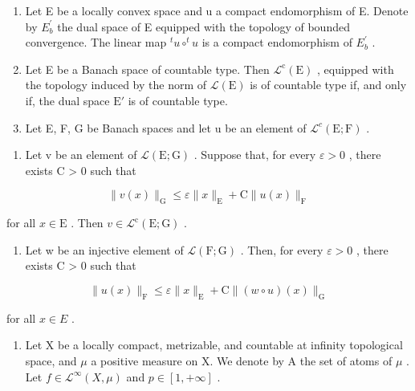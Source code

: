 \begin{enumerate}
\def\labelenumi{\arabic{enumi})}
\setcounter{enumi}{15}
\item
  Let E be a locally convex space and u a compact endomorphism of E. Denote by \(E_{b}^{\prime}\) the dual space of E equipped with the topology of bounded convergence. The linear map \(^{t}u \circ ^{t}u\) is a compact endomorphism of \(E_{b}^{\prime}\) .
\item
  Let E be a Banach space of countable type. Then \(\mathcal{L}^{\mathrm{c}}(\mathrm{E})\) , equipped with the topology induced by the norm of \(\mathcal{L}(\mathrm{E})\) is of countable type if, and only if, the dual space \(\mathrm{E}'\) is of countable type.
\item
  Let E, F, G be Banach spaces and let u be an element of \(\mathcal{L}^{c}(\mathrm{E};\mathrm{F})\) .
\end{enumerate}

\begin{enumerate}
\def\labelenumi{\alph{enumi})}
\tightlist
\item
  Let v be an element of \(\mathcal{L}(\mathrm{E};\mathrm{G})\) . Suppose that, for every \(\varepsilon > 0\) , there exists C \textgreater{} 0 such that
\end{enumerate}

\[
\| v (x) \| _ {\mathrm{G}} \leqslant \varepsilon \| x \| _ {\mathrm{E}} + \mathrm{C} \| u (x) \| _ {\mathrm{F}}
\]

for all \(x\in \mathrm{E}\) . Then \(v\in \mathcal{L}^{\mathrm{c}}(\mathrm{E};\mathrm{G})\) .

\begin{enumerate}
\def\labelenumi{\alph{enumi})}
\setcounter{enumi}{1}
\tightlist
\item
  Let w be an injective element of \(\mathcal{L}(\mathrm{F};\mathrm{G})\) . Then, for every \(\varepsilon > 0\) , there exists C \textgreater{} 0 such that
\end{enumerate}

\[
\| u (x) \| _ {\mathrm{F}} \leqslant \varepsilon \| x \| _ {\mathrm{E}} + \mathrm{C} \| (w \circ u) (x) \| _ {\mathrm{G}}
\]

for all \(x \in E\) .

\begin{enumerate}
\def\labelenumi{\arabic{enumi})}
\setcounter{enumi}{18}
\tightlist
\item
  Let X be a locally compact, metrizable, and countable at infinity topological space, and \(\mu\) a positive measure on X. We denote by A the set of atoms of \(\mu\) . Let \(f \in \mathcal{L}^{\infty}(X, \mu)\) and \(p \in [1, +\infty]\) .
\end{enumerate}

